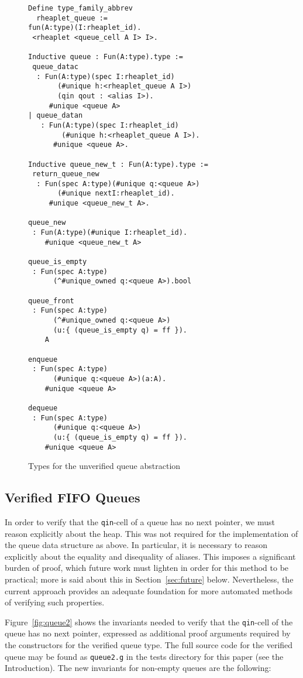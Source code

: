 \documentclass[9pt,natbib]{sigplanconf}
\begin{document}
\begin{figure}
\small
\begin{verbatim}
Define type_family_abbrev
  rheaplet_queue := 
fun(A:type)(I:rheaplet_id).
 <rheaplet <queue_cell A I> I>.

Inductive queue : Fun(A:type).type :=
 queue_datac
  : Fun(A:type)(spec I:rheaplet_id)
       (#unique h:<rheaplet_queue A I>)
       (qin qout : <alias I>).
     #unique <queue A>
| queue_datan
   : Fun(A:type)(spec I:rheaplet_id)
        (#unique h:<rheaplet_queue A I>).
      #unique <queue A>.

Inductive queue_new_t : Fun(A:type).type :=
 return_queue_new
  : Fun(spec A:type)(#unique q:<queue A>)
       (#unique nextI:rheaplet_id).
     #unique <queue_new_t A>.

queue_new
 : Fun(A:type)(#unique I:rheaplet_id).
    #unique <queue_new_t A>

queue_is_empty
 : Fun(spec A:type)
      (^#unique_owned q:<queue A>).bool

queue_front
 : Fun(spec A:type)
      (^#unique_owned q:<queue A>)
      (u:{ (queue_is_empty q) = ff }).
    A 
 
enqueue
 : Fun(spec A:type)
      (#unique q:<queue A>)(a:A).
    #unique <queue A> 

dequeue
 : Fun(spec A:type)
      (#unique q:<queue A>)
      (u:{ (queue_is_empty q) = ff }).
    #unique <queue A>
\end{verbatim}
\caption{Types for the unverified queue abstraction}
\label{fig:queue}
\end{figure}

\subsection{Verified FIFO Queues}
\label{sec:queues}

In order to verify that the \texttt{qin}-cell of a queue has no next
pointer, we must reason explicitly about the heap.  This was not
required for the implementation of the queue data structure as above.
In particular, it is necessary to reason explicitly about the equality
and disequality of aliases.  This imposes a significant burden of
proof, which future work must lighten in order for this method to be
practical; more is said about this in Section~\ref{sec:future} below.
Nevertheless, the current approach provides an adequate foundation for
more automated methods of verifying such properties.

Figure~\ref{fig:queue2} shows the invariants needed to verify that the
\texttt{qin}-cell of the queue has no next pointer, expressed as
additional proof arguments required by the constructors for the
verified queue type.  The full source code for the verified queue may
be found as \texttt{queue2.g} in the tests directory for this paper
(see the Introduction).  The new invariants for non-empty queues are
the following:
\end{document}
